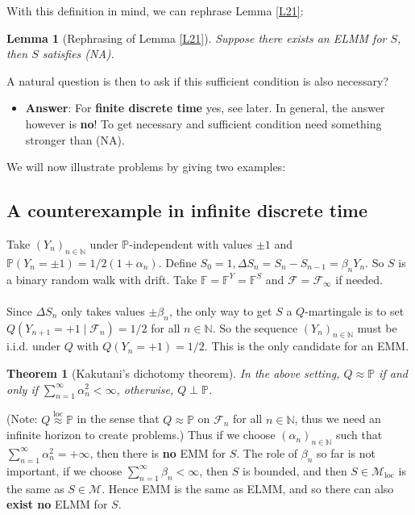 \documentclass[12pt,a4paper, twoside]{article}
\newtheorem{lem}{Lemma}[section]
\newtheorem{thm}{Theorem}[section]
\theoremstyle{definition}
\newcommand{\PP}{\mathbb{P}} %
\begin{document}
With this definition in mind, we can rephrase Lemma \ref{L21}:
\begin{lem}[Rephrasing of Lemma \ref{L21}] Suppose there exists an ELMM for $S$, then $S$ satisfies (NA). 
\end{lem}
A natural question is then to ask if this sufficient condition is also necessary?
\begin{itemize}
\item \textbf{Answer}: For \textbf{finite discrete time} yes, see later. In general, the answer however is \textbf{no}! To get necessary and sufficient condition need something stronger than (NA). 
\end{itemize}
We will now illustrate problems by giving two examples:
\subsection{A counterexample in infinite discrete time}
Take $(Y_n)_{n \in \mathbb{N}}$ under $\PP$-independent with values $\pm 1$ and $\PP(Y_n= \pm 1)= 1/2(1+ \alpha_n)$. Define $S_0=1, \Delta S_n= S_n-S_{n-1}= \beta_n Y_n$. So $S$ is a binary random walk with drift. Take $\mathbb{F}= \mathbb{F}^Y= \mathbb{F}^S$ and $\mathcal{F}= \mathcal{F}_\infty$ if needed. \\
\\
Since $\Delta S_n$ only takes values $\pm \beta_n$, the only way to get $S$ a $Q$-martingale is to set $Q(Y_{n+1}= +1 \mid \mathcal{F}_n)= 1/2$ for all $n \in \mathbb{N}$. So the sequence $(Y_n)_{n \in \mathbb{N}}$ must be i.i.d. under $Q$ with $Q(Y_n=+1)=1/2$. This is the only candidate for an EMM. 
\begin{thm}[Kakutani's dichotomy theorem] In the above setting, $Q \approx \PP$ if and only if $\sum_{n=1}^\infty \alpha_n^2 < \infty$, otherwise, $Q \perp \PP$. 
\end{thm}
(Note: $Q \overset{\text{loc}}\approx \PP$ in the sense that $Q \approx \PP$ on $\mathcal{F}_n$ for all $n \in \mathbb{N}$, thus we need an infinite horizon to create problems.)
\newpage
Thus if we choose $(\alpha_n)_{n \in \mathbb{N}}$ such that $\sum_{n=1}^\infty \alpha_n^2 = + \infty$, then there is \textbf{no} EMM for $S$. The role of $\beta_n$ so far is not important, if we choose $\sum_{n=1}^\infty \beta_n < \infty$, then $S$ is bounded, and then $S \in \mathcal{M}_{\text{loc}}$ is the same as $S \in \mathcal{M}$. Hence EMM is the same as ELMM, and so there can also \textbf{exist no} ELMM for $S$. \\
\\
\end{document}
